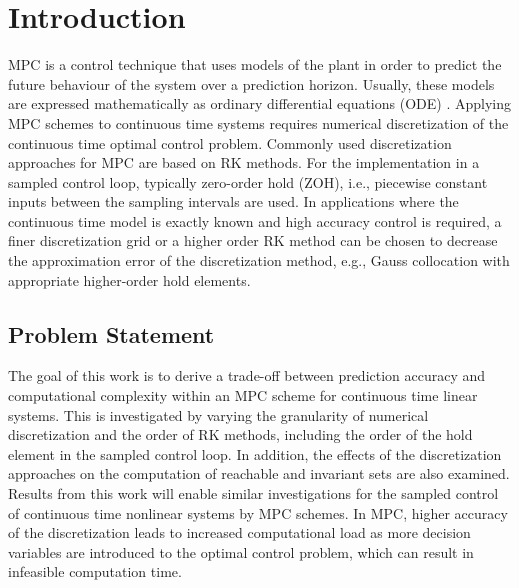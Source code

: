 \chapter{Introduction}
\label{sec:introduction}

MPC is a control technique that uses models of the plant in order to predict the future behaviour of the system over a prediction horizon. Usually, these models are expressed mathematically as ordinary differential equations (ODE) \cite{sanchez2017mpc}. Applying MPC schemes to continuous time systems requires numerical
discretization of the continuous time optimal control problem. Commonly used discretization approaches for MPC are based on RK methods. For the implementation in a sampled control loop, typically zero-order hold (ZOH), i.e., piecewise constant inputs between the sampling intervals are used. In applications where the continuous time model is exactly known and high accuracy control is required, a finer discretization grid or a higher order RK method can be chosen to decrease the
approximation error of the discretization method, e.g., Gauss collocation \cite{kotyczka2021high} with appropriate higher-order hold elements.

\section{Problem Statement}

 The goal of this work is to derive a trade-off between prediction accuracy and computational complexity within an MPC scheme for continuous time linear systems. This is investigated by varying the granularity of numerical discretization and the order of RK methods, including the order of the hold element in the sampled control loop. In addition, the effects of the discretization approaches on the computation of reachable and invariant sets are also examined. Results from this work will enable similar investigations for the sampled control of continuous time nonlinear systems by MPC schemes.  In MPC, higher accuracy of the discretization leads to increased computational load as more decision variables are introduced to the optimal control problem, which can result in infeasible computation time.



